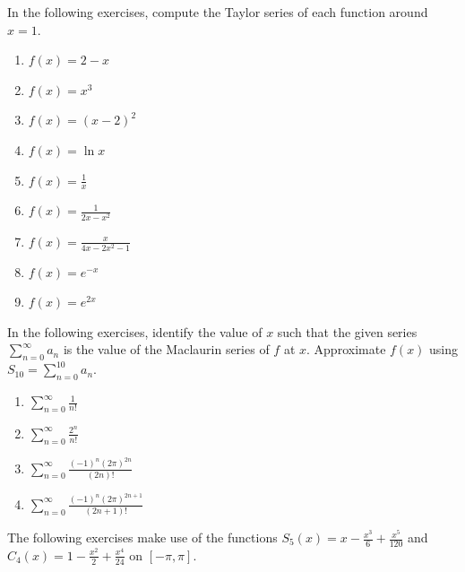 \documentclass{exercises}
\begin{document}
In the following exercises, compute the Taylor series of each function around $x=1$.

\begin{enumerate}[resume]
\item $f(x)=2-x$
\item $f(x)=x^{3}$
\item $f(x)={(x-2)}^{2}$
\item $f(x)=\ln x$
\item $f(x)=\frac{1}{x}$
\item $f(x)=\frac{1}{2x-x^{2}}$
\item $f(x)=\frac{x}{4x-2x^{2}-1}$
\item $f(x)=e^{-x}$
\item $f(x)=e^{2x}$
\end{enumerate}

\techrequired In the following exercises, identify the value of $x$ such that the given series $\sum_{n=0}^{\infty}a_{n}$ is the value of the Maclaurin series of $f$ at $x$. Approximate $f(x)$ using $S_{10}=\sum_{n=0}^{10}a_{n}$.

\begin{enumerate}[resume]
\item $\sum_{n=0}^{\infty}\frac{1}{n!}$
\item $\sum_{n=0}^{\infty}\frac{2^{n}}{n!}$
\item $\sum_{n=0}^{\infty}\frac{{(-1)}^{n}{(2\pi)}^{2n}}{(2n)!}$
\item $\sum_{n=0}^{\infty}\frac{{(-1)}^{n}{(2\pi)}^{2n+1}}{(2n+1)!}$
\end{enumerate}

The following exercises make use of the functions $S_{5}(x)=x-\frac{x^{3}}{6}+\frac{x^{5}}{120}$ and $C_{4}(x)=1-\frac{x^{2}}{2}+\frac{x^{4}}{24}$ on $[-\pi,\pi]$.
\end{document}
